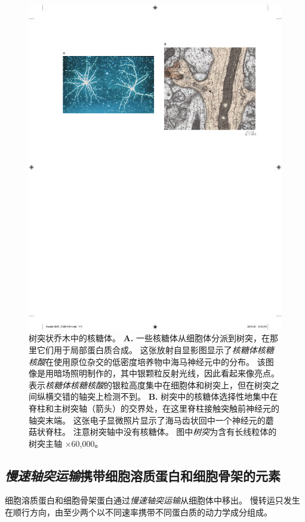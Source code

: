 \begin{figure}[htbp]
	\centering
	\includegraphics[width=0.85\linewidth]{chap07/fig_7_12}
	\caption{树突状乔木中的核糖体。
		\textbf{A.} 一些核糖体从细胞体分派到树突，在那里它们用于局部蛋白质合成。
		这张放射自显影图显示了\textit{核糖体核糖核酸}在使用原位杂交的低密度培养物中海马神经元中的分布。
		该图像是用暗场照明制作的，其中银颗粒反射光线，因此看起来像亮点。
		表示\textit{核糖体核糖核酸}的银粒高度集中在细胞体和树突上，但在树突之间纵横交错的轴突上检测不到。
		\textbf{B.} 树突中的核糖体选择性地集中在脊柱和主树突轴（箭头）的交界处，在这里脊柱接触突触前神经元的轴突末端。
		这张电子显微照片显示了海马齿状回中一个神经元的蘑菇状脊柱。
		注意树突轴中没有核糖体。
		图中\textit{树突}为含有长线粒体的树突主轴 ×60,000。}
	\label{fig:7_12}
\end{figure}


\subsection{\textit{慢速轴突运输}携带细胞溶质蛋白和细胞骨架的元素}

细胞溶质蛋白和细胞骨架蛋白通过\textit{慢速轴突运输}从细胞体中移出。
慢转运只发生在顺行方向，由至少两个以不同速率携带不同蛋白质的动力学成分组成。



